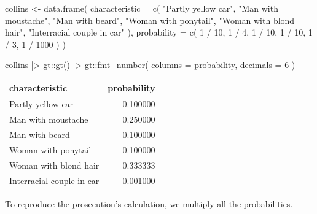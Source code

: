 \documentclass[
  letterpaper,
  DIV=11,
  numbers=noendperiod]{scrreprt}
\newenvironment{Shaded}{\begin{snugshade}}{\end{snugshade}}
\newcommand{\AttributeTok}[1]{\textcolor[rgb]{0.40,0.45,0.13}{#1}}
\newcommand{\DecValTok}[1]{\textcolor[rgb]{0.68,0.00,0.00}{#1}}
\newcommand{\FunctionTok}[1]{\textcolor[rgb]{0.28,0.35,0.67}{#1}}
\newcommand{\NormalTok}[1]{\textcolor[rgb]{0.00,0.23,0.31}{#1}}
\newcommand{\OtherTok}[1]{\textcolor[rgb]{0.00,0.23,0.31}{#1}}
\newcommand{\SpecialCharTok}[1]{\textcolor[rgb]{0.37,0.37,0.37}{#1}}
\newcommand{\StringTok}[1]{\textcolor[rgb]{0.13,0.47,0.30}{#1}}
\begin{document}
\begin{Shaded}
\begin{Highlighting}[]
\NormalTok{collins }\OtherTok{\textless{}{-}} \FunctionTok{data.frame}\NormalTok{(}
  \AttributeTok{characteristic =} \FunctionTok{c}\NormalTok{(}
    \StringTok{"Partly yellow car"}\NormalTok{,}
    \StringTok{"Man with moustache"}\NormalTok{,}
    \StringTok{"Man with beard"}\NormalTok{,}
    \StringTok{"Woman with ponytail"}\NormalTok{,}
    \StringTok{"Woman with blond hair"}\NormalTok{,}
    \StringTok{"Interracial couple in car"}
\NormalTok{  ),}
  \AttributeTok{probability =} \FunctionTok{c}\NormalTok{(}
    \DecValTok{1} \SpecialCharTok{/} \DecValTok{10}\NormalTok{,}
    \DecValTok{1} \SpecialCharTok{/} \DecValTok{4}\NormalTok{,}
    \DecValTok{1} \SpecialCharTok{/} \DecValTok{10}\NormalTok{,}
    \DecValTok{1} \SpecialCharTok{/} \DecValTok{10}\NormalTok{,}
    \DecValTok{1} \SpecialCharTok{/} \DecValTok{3}\NormalTok{,}
    \DecValTok{1} \SpecialCharTok{/} \DecValTok{1000}
\NormalTok{  )}
\NormalTok{)}

\NormalTok{collins }\SpecialCharTok{|\textgreater{}}
\NormalTok{  gt}\SpecialCharTok{::}\FunctionTok{gt}\NormalTok{() }\SpecialCharTok{|\textgreater{}}
\NormalTok{  gt}\SpecialCharTok{::}\FunctionTok{fmt\_number}\NormalTok{(}
    \AttributeTok{columns =}\NormalTok{ probability,}
    \AttributeTok{decimals =} \DecValTok{6}
\NormalTok{  )}
\end{Highlighting}
\end{Shaded}

\begin{table}
\fontsize{12.0pt}{14.0pt}\selectfont
\begin{tabular*}{\linewidth}{@{\extracolsep{\fill}}lr}
\toprule
characteristic & probability \\ 
\midrule\addlinespace[2.5pt]
Partly yellow car & 0.100000 \\ 
Man with moustache & 0.250000 \\ 
Man with beard & 0.100000 \\ 
Woman with ponytail & 0.100000 \\ 
Woman with blond hair & 0.333333 \\ 
Interracial couple in car & 0.001000 \\ 
\bottomrule
\end{tabular*}
\end{table}

To reproduce the prosecution's calculation, we multiply all the
probabilities.
\end{document}
